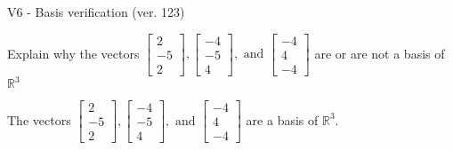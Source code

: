 \begin{exercise}
  \begin{exerciseTitle}V6 - Basis verification (ver. 123)\end{exerciseTitle}
  \begin{exerciseStatement}
    Explain why the vectors \(\left[\begin{array}{r}
2 \\
-5 \\
2
\end{array}\right] , \left[\begin{array}{r}
-4 \\
-5 \\
4
\end{array}\right] , \text{ and } \left[\begin{array}{r}
-4 \\
4 \\
-4
\end{array}\right]\) are or are not a basis of \(\mathbb{R}^3\)	


  \end{exerciseStatement}
  \begin{exerciseAnswer}
   The vectors \(\left[\begin{array}{r}
2 \\
-5 \\
2
\end{array}\right] , \left[\begin{array}{r}
-4 \\
-5 \\
4
\end{array}\right] , \text{ and } \left[\begin{array}{r}
-4 \\
4 \\
-4
\end{array}\right]\) 
  	 are  a basis of \(\mathbb{R}^3\).
  


  \end{exerciseAnswer}
\end{exercise}